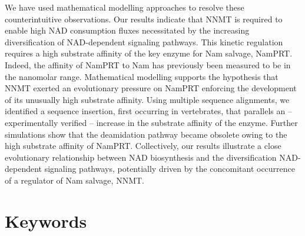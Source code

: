 \documentclass[paper=a4, 12pt]{scrartcl}
\begin{document}
We have used mathematical modelling approaches to resolve these counterintuitive observations. Our results indicate that NNMT is required to enable high NAD consumption fluxes necessitated by the increasing diversification of NAD-dependent signaling pathways. This kinetic regulation requires a high substrate affinity of the key enzyme for Nam salvage, NamPRT. Indeed, the affinity of NamPRT to Nam has previously been measured to be in the nanomolar range. Mathematical modelling supports the hypothesis that NNMT exerted an evolutionary pressure on NamPRT enforcing the development of its unusually high substrate affinity. Using multiple sequence alignments, we identified a sequence insertion, first occurring in vertebrates, that parallels an – experimentally verified – increase in the substrate affinity of the enzyme. Further simulations show that the deamidation pathway became obsolete owing to the high substrate affinity of NamPRT. Collectively, our results illustrate a close evolutionary relationship between NAD biosynthesis and the diversification NAD-dependent signaling pathways, potentially driven by the concomitant occurrence of a regulator of Nam salvage, NNMT.


\section{Keywords}
















\end{document}
